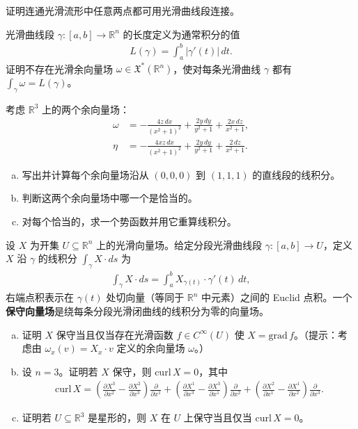 \documentclass[../../main.tex]{subfiles}
\begin{document}
\begin{exercise}\label{exercise:ch11-12}
证明连通光滑流形中任意两点都可用光滑曲线段连接。
\end{exercise}

\begin{exercise}\label{exercise:ch11-13}
光滑曲线段 $\gamma\colon[a,b]\to\mathbb{R}^n$ 的长度定义为通常积分的值
\begin{align*}
L(\gamma)=\int_a^b|\gamma'(t)|\,dt.
\end{align*}
证明不存在光滑余向量场 $\omega\in\mathfrak X^*(\mathbb{R}^n)$，使对每条光滑曲线 $\gamma$ 都有 $\int_\gamma\omega=L(\gamma)$。
\end{exercise}

\begin{exercise}\label{exercise:ch11-14}
考虑 $\mathbb{R}^3$ 上的两个余向量场：
\begin{align*}
\omega&=-\frac{4z\,dx}{(x^2+1)^2}+\frac{2y\,dy}{y^2+1}+\frac{2x\,dz}{x^2+1},\\
\eta&=-\frac{4xz\,dx}{(x^2+1)^2}+\frac{2y\,dy}{y^2+1}+\frac{2\,dz}{x^2+1}.
\end{align*}
\begin{enumerate}[(a)]
\item 写出并计算每个余向量场沿从 $(0,0,0)$ 到 $(1,1,1)$ 的直线段的线积分。
\item 判断这两个余向量场中哪一个是恰当的。
\item 对每个恰当的，求一个势函数并用它重算线积分。
\end{enumerate}
\end{exercise}

\begin{exercise}[向量场的线积分]\label{exercise:ch11-15}
设 $X$ 为开集 $U\subseteq\mathbb{R}^n$ 上的光滑向量场。给定分段光滑曲线段 $\gamma\colon[a,b]\to U$，定义 $X$ 沿 $\gamma$ 的线积分 $\int_\gamma X\cdot ds$ 为
\begin{align*}
\int_\gamma X\cdot ds=\int_a^b X_{\gamma(t)}\cdot\gamma'(t)\,dt,
\end{align*}
右端点积表示在 $\gamma(t)$ 处切向量（等同于 $\mathbb{R}^n$ 中元素）之间的 Euclid 点积。一个\textbf{保守向量场}是绕每条分段光滑闭曲线的线积分为零的向量场。
\begin{enumerate}[(a)]
\item 证明 $X$ 保守当且仅当存在光滑函数 $f\in C^\infty(U)$ 使 $X=\mathrm{grad}\,f$。（提示：考虑由 $\omega_x(v)=X_x\cdot v$ 定义的余向量场 $\omega$。）
\item 设 $n=3$。证明若 $X$ 保守，则 $\mathrm{curl}\,X=0$，其中
\begin{align*}
\mathrm{curl}\,X=\left(\frac{\partial X^3}{\partial x^2}-\frac{\partial X^2}{\partial x^3}\right)\frac{\partial}{\partial x^1}
+\left(\frac{\partial X^1}{\partial x^3}-\frac{\partial X^3}{\partial x^1}\right)\frac{\partial}{\partial x^2}
+\left(\frac{\partial X^2}{\partial x^1}-\frac{\partial X^1}{\partial x^2}\right)\frac{\partial}{\partial x^3}.
\end{align*}
\item 证明若 $U\subseteq\mathbb{R}^3$ 是星形的，则 $X$ 在 $U$ 上保守当且仅当 $\mathrm{curl}\,X=0$。
\end{enumerate}
\end{exercise}
\end{document}

